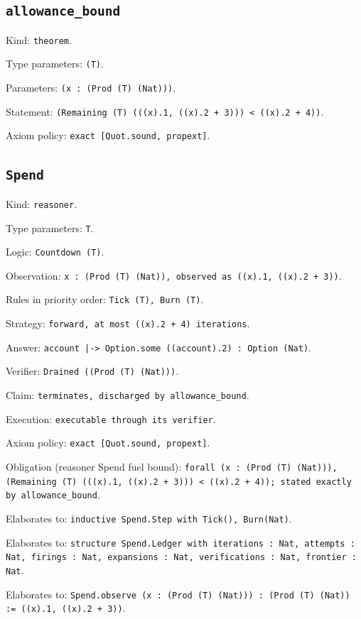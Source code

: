 \documentclass[11pt]{article}
\begin{document}
\subsection*{\texttt{allowance\_bound}}
\noindent Kind: \texttt{theorem}.\par
\noindent Type parameters: \texttt{(T)}.\par
\noindent Parameters: \texttt{(x : (Prod (T) (Nat)))}.\par
\noindent Statement: \texttt{(Remaining (T) (((x).1, ((x).2 + 3))) < ((x).2 + 4))}.\par
\noindent Axiom policy: \texttt{exact [Quot.sound, propext]}.\par
\subsection*{\texttt{Spend}}
\noindent Kind: \texttt{reasoner}.\par
\noindent Type parameters: \texttt{T}.\par
\noindent Logic: \texttt{Countdown (T)}.\par
\noindent Observation: \texttt{x : (Prod (T) (Nat)), observed as ((x).1, ((x).2 + 3))}.\par
\noindent Rules in priority order: \texttt{Tick (T), Burn (T)}.\par
\noindent Strategy: \texttt{forward, at most ((x).2 + 4) iterations}.\par
\noindent Answer: \texttt{account |-> Option.some ((account).2) : Option (Nat)}.\par
\noindent Verifier: \texttt{Drained ((Prod (T) (Nat)))}.\par
\noindent Claim: \texttt{terminates, discharged by allowance\_bound}.\par
\noindent Execution: \texttt{executable through its verifier}.\par
\noindent Axiom policy: \texttt{exact [Quot.sound, propext]}.\par
\noindent Obligation (reasoner Spend fuel bound): \texttt{forall (x : (Prod (T) (Nat))), (Remaining (T) (((x).1, ((x).2 + 3))) < ((x).2 + 4)); stated exactly by allowance\_bound}.\par
\noindent Elaborates to: \texttt{inductive Spend.Step with Tick(), Burn(Nat)}.\par
\noindent Elaborates to: \texttt{structure Spend.Ledger with iterations : Nat, attempts : Nat, firings : Nat, expansions : Nat, verifications : Nat, frontier : Nat}.\par
\noindent Elaborates to: \texttt{Spend.observe (x : (Prod (T) (Nat))) : (Prod (T) (Nat)) := ((x).1, ((x).2 + 3))}.\par
\end{document}
